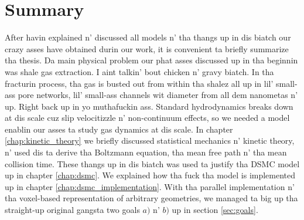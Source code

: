 \section{Summary}
After havin explained n' discussed all models n' tha thangs up in dis biatch our crazy asses have obtained durin our work, it is convenient ta briefly summarize tha thesis. Da main physical problem our phat asses discussed up in tha beginnin was shale gas extraction. I aint talkin' bout chicken n' gravy biatch. In tha fracturin process, tha gas is busted out from within tha shalez all up in lil' small-ass pore networks, lil' small-ass channels wit diameter from all dem nanometas n' up. Right back up in yo muthafuckin ass. Standard hydrodynamics breaks down at dis scale cuz slip velocitizzle n' non-continuum effects, so we needed a model enablin our asses ta study gas dynamics at dis scale. In chapter \ref{chap:kinetic_theory} we briefly discussed statistical mechanics n' kinetic theory, n' used dis ta derive tha Boltzmann equation, tha mean free path n' tha mean collision time. These thangs up in dis biatch was used ta justify tha DSMC model up in chapter \ref{chap:dsmc}. We explained how tha fuck tha model is implemented up in chapter \ref{chap:dsmc_implementation}. With tha parallel implementation n' tha voxel-based representation of arbitrary geometries, we managed ta big up tha straight-up original gangsta two goals $a)$ n' $b)$ up in section \ref{sec:goals}.

